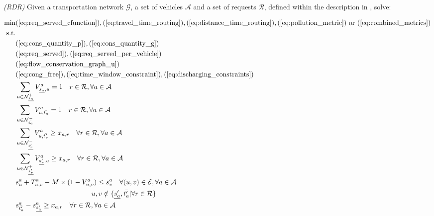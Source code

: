 \begin{algori}{\textit{(RDR)}}
	Given a transportation network $\mathcal{G}$, a set of vehicles $\mathcal{A}$ and a set of requests $\mathcal{R}$, defined within the description in , solve:
	\label{RDR}
\end{algori}

\begin{align}
	\text{min}&  
		(\ref{eq:req_served_cfunction}),
		(\ref{eq:travel_time_routing}), (\ref{eq:distance_time_routing}), (\ref{eq:pollution_metric}) \text{ or } (\ref{eq:combined_metrics})
	\nonumber\\
	\text{s.t.} &\nonumber\\
	&(\ref{eq:cons_quantity_p}),(\ref{eq:cons_quantity_g})\nonumber\\	
	&(\ref{eq:req_served}),(\ref{eq:req_served_per_vehicle})\nonumber\\	
	&(\ref{eq:flow_conservation_graph_u})\nonumber\\%
	&(\ref{eq:cong_free}),(\ref{eq:time_window_constraint}),(\ref{eq:discharging_constraints})\nonumber\\
	&\sum_{ u \in \mathcal{N}^+_{\underline{s_a}} }V^a_{ \underline{s_a},u} = 1 \quad r \in \mathcal{R},  \forall a \in \mathcal{A} \label{eq:flow_cons_arrival_graph_u_d}\\
	&\sum_{u \in \mathcal{N}^-_{\bar{t_a}} } V^a_{u, \bar{t_a}} = 1 \quad r \in \mathcal{R},  \forall a \in \mathcal{A} \label{eq:flow_cons_departure_graph_u_d}\\
	&\sum_{u \in \mathcal{N}^-_{\underline{t'_r}} } V^a_{u, \bar{t'_r}} \ge x_{a,r} \quad  \forall r \in \mathcal{R}, \forall a \in \mathcal{A} \label{eq:must_arrive_dep}	\\
	&\sum_{u \in \mathcal{N}^+_{\underline{s'_r}} } V^a_{ \underline{s'_r}, u} \ge x_{a,r} \quad   \forall r \in \mathcal{R}, \forall a \in \mathcal{A}\label{eq:must_go_start}\\
	&s_{u}^a + T_{u,v}^a - M\times(1-V^a_{u,v}) \leq s_{v}^a  \quad \forall (u,v) \in \mathcal{E},  \forall a \in \mathcal{A}\label{eq:relations_node_time_2}\\
	 &\quad \quad \quad\quad \quad \quad \quad \quad \quad \quad \quad u,v \notin \{\underline{s'_a},\bar{t'_a} | \forall r \in \mathcal{R}\}\nonumber\\
	 &s_{\bar{t'_a} }^a - s_{\underline{s'_a} }^a \ge x_{a,r}  \quad \forall r \in \mathcal{R}, \forall a \in \mathcal{A} \label{eq:req_order}
\end{align}

